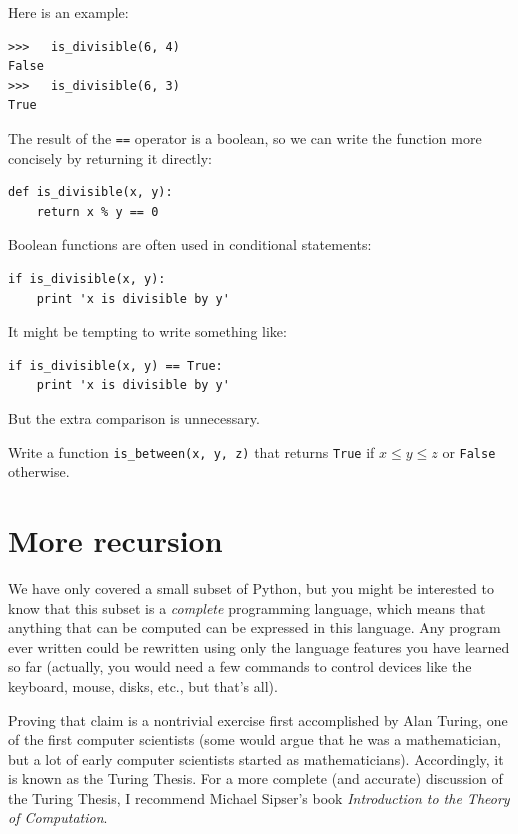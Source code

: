 \documentclass[10pt]{book}
\begin{document}
\begin{CJK}{UTF8}{gbsn}
Here is an example:

\begin{verbatim}
>>>   is_divisible(6, 4)
False
>>>   is_divisible(6, 3)
True
\end{verbatim}
%
The result of the {\tt ==} operator is a boolean, so we can write the
function more concisely by returning it directly:

\begin{verbatim}
def is_divisible(x, y):
    return x % y == 0
\end{verbatim}
%
Boolean functions are often used in conditional statements:

\begin{verbatim}
if is_divisible(x, y):
    print 'x is divisible by y'
\end{verbatim}
%
It might be tempting to write something like:

\begin{verbatim}
if is_divisible(x, y) == True:
    print 'x is divisible by y'
\end{verbatim}
%
But the extra comparison is unnecessary.

\begin{exercise}

Write a function \verb"is_between(x, y, z)" that
returns {\tt True} if $x \le y \le z$ or {\tt False} otherwise.

\end{exercise}


\section{More recursion}
\label{more.recursion}

We have only covered a small subset of Python, but you might
be interested to know that this subset is a {\em complete}
programming language, which means that anything that can be
computed can be expressed in this language.  Any program ever written
could be rewritten using only the language features you have learned
so far (actually, you would need a few commands to control devices
like the keyboard, mouse, disks, etc., but that's all).

Proving that claim is a nontrivial exercise first accomplished by Alan
Turing, one of the first computer scientists (some would argue that he
was a mathematician, but a lot of early computer scientists started as
mathematicians).  Accordingly, it is known as the Turing Thesis.
For a more complete (and accurate) discussion of the Turing Thesis,
I recommend Michael Sipser's book {\em Introduction to the
Theory of Computation}.


\end{CJK}
\end{document}
